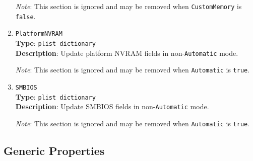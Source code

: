 \documentclass[]{article}
\begin{document}
\begin{enumerate}
  \emph{Note}: This section is ignored and may be removed when
  \texttt{CustomMemory} is \texttt{false}.
\item
  \texttt{PlatformNVRAM}\\
  \textbf{Type}: \texttt{plist\ dictionary}\\
  \textbf{Description}: Update platform NVRAM fields in non-\texttt{Automatic} mode.

  \emph{Note}: This section is ignored and may be removed when
  \texttt{Automatic} is \texttt{true}.
\item
  \texttt{SMBIOS}\\
  \textbf{Type}: \texttt{plist\ dictionary}\\
  \textbf{Description}: Update SMBIOS fields in non-\texttt{Automatic} mode.

  \emph{Note}: This section is ignored and may be removed when
  \texttt{Automatic} is \texttt{true}.
\end{enumerate}

\subsection{Generic Properties}\label{platforminfogeneric}
\end{document}
